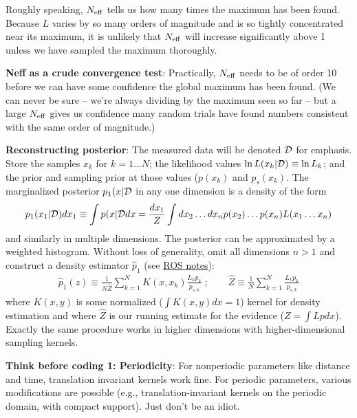 \documentclass[twocolumn,prd,nofootinbib]{revtex4}
\begin{document}
\begin{widetext}
Roughly speaking, $N_{\rm eff}$ tells us how many times the maximum has been found.  Because $L$ varies by so many
orders of magnitude and is so tightly concentrated near its maximum, it is unlikely that $N_{\rm eff}$ will increase
significantly above 1 unless we have sampled the maximum thoroughly.

\begin{shaded}
\noindent \textbf{Neff as  a crude convergence test}: Practically, $N_{\rm eff}$ needs to be of order 10 before we can have some confidence the global maximum has been
found.  (We can never be sure -- we're always dividing by the maximum seen so far -- but a large $N_{\rm eff}$ gives us
confidence many random trials have found numbers consistent with the same order of magnitude.)
\end{shaded}

\noindent \textbf{Reconstructing posterior}: The measured data will be denoted ${\cal D}$ for emphasis.  Store the
samples $x_k$ for $k=1 \ldots N$; the likelihood values $\ln L(x_k|{\cal D})\equiv \ln L_k$;
and the prior and sampling prior at those values ($p(x_k)$ and $p_s(x_k)$.   The marginalized posterior $p_1(x|{\cal D}$ in any one dimension is a
density of the form
\begin{eqnarray}
p_1(x_1|{\cal D}) dx_1 \equiv \int p(x|{\cal D} dx = \frac{dx_1}{Z} \int dx_{2}\ldots dx_n p(x_2)\ldots p(x_n)L(x_1\ldots x_n) 
\end{eqnarray}
and similarly in multiple dimensions.   The posterior can be approximated by a weighted histogram.  Without loss of
generality, omit all dimensions $n>1$ and construct a density estimator $\hat{p}_1$ (see
\href{file://localhost//Users/oshaughn/unixhome/NotesAndReferences/ReferenceSheets/math/ProbabilityAndMeasure/ContinuouStatistics/cont_statistics}{ROS notes}):
\begin{eqnarray}
\hat{p}_1(z) \equiv \frac{1}{N \hat{Z}}\sum_{k=1}^N K(x,x_k) \frac{L_k p_k}{p_{s,k}} 
\; ; \qquad
\hat{Z} \equiv \frac{1}{N} \sum_{k=1}^N \frac{L_k p_k}{p_{s,k}}
\end{eqnarray}
where $K(x,y)$ is some normalized ($\int K(x,y) dx = 1$) kernel for density estimation and where $\hat{Z}$ is our running
estimate for the evidence ($Z = \int L p dx$).  Exactly the same procedure works in higher dimensions with
higher-dimensional sampling kernels.
\begin{shaded}
\noindent \textbf{Think before coding 1: Periodicity}: 
For nonperiodic parameters like distance and time, translation invariant kernels work fine.  For periodic parameters,
various modifications are possible (e.g., translation-invariant kernels on the periodic domain, with compact support).
Just don't be an idiot.


\end{shaded}
\end{widetext}
\end{document}
